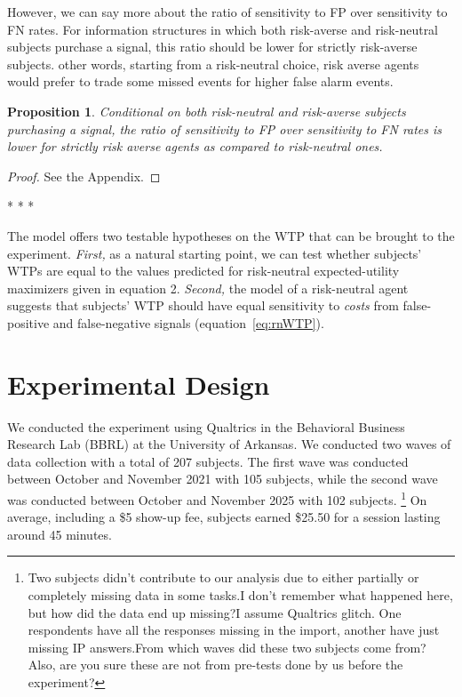 \documentclass[12pt,a4paper]{article}
\newcommand{\agt}[1]{{\color{OliveGreen}#1}}
\newcommand{\aut}[1]{{\color{Red}#1}}
\newcommand{\pmt}[1]{{\color{Blue}#1}}
\newtheorem{theorem}{Proposition}
\begin{document}
However, we can say more about the ratio of sensitivity to FP over sensitivity to FN rates. For information structures in which both risk-averse and risk-neutral subjects purchase a signal, this ratio should be lower for strictly risk-averse subjects. \In other words, starting from a risk-neutral choice, risk averse agents would prefer to trade some missed events for higher false alarm events.

\begin{theorem}
Conditional on both risk-neutral and risk-averse subjects purchasing a signal, the ratio of sensitivity to FP over sensitivity to FN rates is lower for strictly risk averse agents as compared to risk-neutral ones.
\end{theorem}\label{thm:riskAverse2}  

\begin{proof}
See the Appendix.
\end{proof}



\begin{center} * * * \end{center}
The model offers two testable hypotheses on the WTP that can be brought to the experiment. \emph{First,} as a natural starting point, we can test whether subjects' WTPs are equal to the values predicted for risk-neutral expected-utility maximizers given in equation 2. \emph{Second,} the model of a risk-neutral agent suggests that subjects' WTP should have equal sensitivity to \emph{costs} from false-positive and false-negative signals (equation~\ref{eq:rnWTP}). 

\section{Experimental Design}\label{sec:design}

We conducted the experiment using Qualtrics in the Behavioral Business Research Lab (BBRL) at the University of Arkansas. We conducted two waves of data collection with a total of 207 subjects. The first wave was conducted between October and November 2021 with 105 subjects, while the second wave was conducted between October and November 2025 with 102 subjects. \footnote{\aut{Two subjects didn't contribute to our analysis due to either partially or completely missing data in some tasks.}\pmt{I don't remember what happened here, but how did the data end up missing?}\aut{I assume Qualtrics glitch. One respondents have all the responses missing in the import, another have just missing IP answers.}\agt{From which waves did these two subjects come from? Also, are you sure these are not from pre-tests done by us before the experiment?}} On average, including a \$5 show-up fee, subjects earned \$25.50 for a session lasting around 45 minutes. 
 
\end{document}
